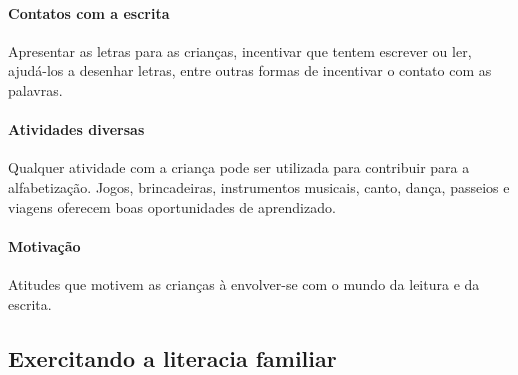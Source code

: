 \documentclass[11pt]{extarticle}
\begin{document}
\paragraph{Contatos com a escrita} Apresentar as letras para as 
crianças, incentivar que tentem escrever ou ler, ajudá-los a desenhar letras, 
entre outras formas de incentivar o contato com as palavras.

\paragraph{Atividades diversas} Qualquer atividade com a criança 
pode ser utilizada para contribuir para a alfabetização. Jogos, brincadeiras, 
instrumentos musicais, canto, dança, passeios e viagens oferecem boas 
oportunidades de aprendizado.

\paragraph{Motivação} Atitudes que motivem as crianças à envolver-se com 
o mundo da leitura e da escrita.

\subsection{Exercitando a literacia familiar}

\end{document}

